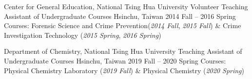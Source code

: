 \begin{cventries}
\cventry
{Center for General Education, National Tsing Hua University}
{Volunteer Teaching Assistant of Undergraduate Courses}
{Hsinchu, Taiwan}
{2014 Fall -- 2016 Spring}
{Courses: Forensic Science and Crime Prevention(\textit{2014 Fall}, \textit{2015 Fall}) \& Crime Investigation Technology (\textit{2015 Spring}, \textit{2016 Spring})}

\cventry
{Department of Chemistry, National Tsing Hua University}
{Teaching Assistant of Undergraduate Courses}
{Hsinchu, Taiwan}
{2019 Fall -- 2020 Spring}
{Courses: Physical Chemistry Laboratory  (\textit{2019 Fall}) \& Physical Chemistry  (\textit{2020 Spring})}
\end{cventries}